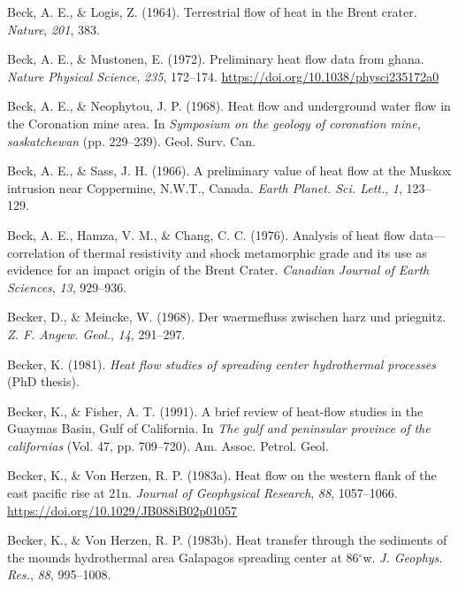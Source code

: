\begin{CSLReferences}{1}{1}
\leavevmode{}%
Beck, A. E., \& Logis, Z. (1964). Terrestrial flow of heat in the {Brent} crater. \emph{Nature}, \emph{201}, 383.

\leavevmode{}%
Beck, A. E., \& Mustonen, E. (1972). Preliminary heat flow data from ghana. \emph{Nature Physical Science}, \emph{235}, 172--174. \url{https://doi.org/10.1038/physci235172a0}

\leavevmode{}%
Beck, A. E., \& Neophytou, J. P. (1968). Heat flow and underground water flow in the {Coronation} mine area. In \emph{Symposium on the geology of coronation mine, saskatchewan} (pp. 229--239). Geol. Surv. Can.

\leavevmode{}%
Beck, A. E., \& Sass, J. H. (1966). A preliminary value of heat flow at the {Muskox} intrusion near {Coppermine, N.W.T., Canada}. \emph{Earth Planet. Sci. Lett.}, \emph{1}, 123--129.

\leavevmode{}%
Beck, A. E., Hamza, V. M., \& Chang, C. C. (1976). Analysis of heat flow data---correlation of thermal resistivity and shock metamorphic grade and its use as evidence for an impact origin of the {Brent Crater}. \emph{Canadian Journal of Earth Sciences}, \emph{13}, 929--936.

\leavevmode{}%
Becker, D., \& Meincke, W. (1968). Der waermefluss zwischen harz und priegnitz. \emph{Z. F. Angew. Geol.}, \emph{14}, 291--297.

\leavevmode{}%
Becker, K. (1981). \emph{Heat flow studies of spreading center hydrothermal processes} (PhD thesis).

\leavevmode{}%
Becker, K., \& Fisher, A. T. (1991). A brief review of heat-flow studies in the {Guaymas Basin, Gulf of California}. In \emph{The gulf and peninsular province of the californias} (Vol. 47, pp. 709--720). Am. Assoc. Petrol. Geol.

\leavevmode{}%
Becker, K., \& Von Herzen, R. P. (1983a). Heat flow on the western flank of the east pacific rise at 21\textdegree{}n. \emph{Journal of Geophysical Research}, \emph{88}, 1057--1066. \url{https://doi.org/10.1029/JB088iB02p01057}

\leavevmode{}%
Becker, K., \& Von Herzen, R. P. (1983b). Heat transfer through the sediments of the mounds hydrothermal area {Galapagos} spreading center at 86\(^\circ\)w. \emph{J. Geophys. Res.}, \emph{88}, 995--1008.


\end{CSLReferences}
